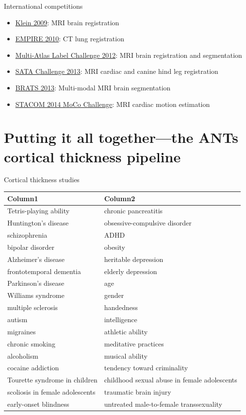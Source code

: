 \documentclass[ignorenonframetext,]{beamer}
\begin{document}
\begin{frame}{International competitions}

\begin{itemize}
\item
  \href{http://www.ncbi.nlm.nih.gov/pubmed/19195496}{Klein 2009}: MRI
  brain registration
\item
  \href{http://empire10.isi.uu.nl}{EMPIRE 2010}: CT lung registration
\item
  \href{https://masi.vuse.vanderbilt.edu/workshop2012/index.php/Main_Page}{Multi-Atlas
  Label Challenge 2012}: MRI brain registration and segmentation
\item
  \href{https://masi.vuse.vanderbilt.edu/workshop2013/index.php/MICCAI_2013_SATA_Challenge_and_Workshop:Current_events}{SATA
  Challenge 2013}: MRI cardiac and canine hind leg registration
\item
  \href{http://martinos.org/qtim/miccai2013/}{BRATS 2013}: Multi-modal
  MRI brain segmentation
\item
  \href{http://www.cardiacatlas.org/web/stacom2014/moco-introduction}{STACOM
  2014 MoCo Challenge}: MRI cardiac motion estimation
\end{itemize}

\end{frame}

\section{Putting it all together---the ANTs cortical thickness
pipeline}\label{putting-it-all-togetherthe-ants-cortical-thickness-pipeline}

\begin{frame}{Cortical thickness studies}

\scriptsize

\begin{longtable}[c]{@{}ll@{}}
\toprule
Column1 & Column2\tabularnewline
\midrule
\endhead
Tetris-playing ability & chronic pancreatitis\tabularnewline
Huntington's disease & obsessive-compulsive disorder\tabularnewline
schizophrenia & ADHD\tabularnewline
bipolar disorder & obesity\tabularnewline
Alzheimer's disease & heritable depression\tabularnewline
frontotemporal dementia & elderly depression\tabularnewline
Parkinson's disease & age\tabularnewline
Williams syndrome & gender\tabularnewline
multiple sclerosis & handedness\tabularnewline
autism & intelligence\tabularnewline
migraines & athletic ability\tabularnewline
chronic smoking & meditative practices\tabularnewline
alcoholism & musical ability\tabularnewline
cocaine addiction & tendency toward criminality\tabularnewline
Tourette syndrome in children & childhood sexual abuse in female
adolescents\tabularnewline
scoliosis in female adolescents & traumatic brain injury\tabularnewline
early-onset blindness & untreated male-to-female
transsexuality\tabularnewline
\bottomrule
\end{longtable}

\end{frame}
\end{document}
